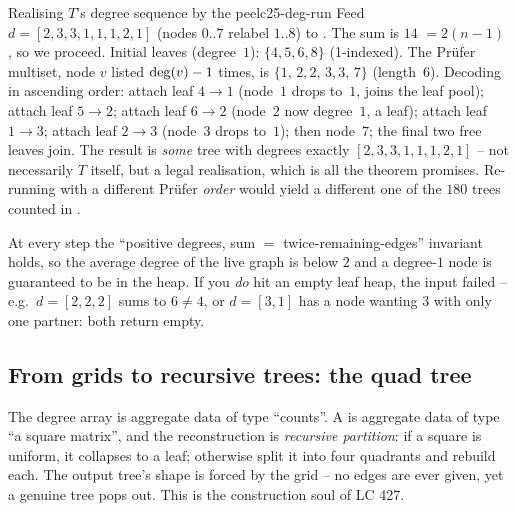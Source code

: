 \begin{example}{Realising $T$'s degree sequence by the peel}{c25-deg-run}
Feed $d=[2,3,3,1,1,1,2,1]$ (nodes $0..7$ relabel $1..8$) to . The sum is $14$
$=2(n-1)$ \checkmark, so we proceed. Initial leaves (degree~$1$): $\{4,5,6,8\}$ (1-indexed). The
Pr\"ufer multiset, node $v$ listed $\operatorname{deg}(v)-1$ times, is $\{1,\,2,2,\,3,3,\,7\}$ (length~$6$).
Decoding in ascending order: attach leaf $4\!\to\!1$ (node~$1$ drops to~$1$, joins the leaf pool);
attach leaf $5\!\to\!2$; attach leaf $6\!\to\!2$ (node~$2$ now degree~$1$, a leaf); attach leaf
$1\!\to\!3$; attach leaf $2\!\to\!3$ (node~$3$ drops to~$1$); then node~$7$; the final two free
leaves join. The result is \emph{some} tree with degrees exactly $[2,3,3,1,1,1,2,1]$ -- not
necessarily $T$ itself, but a legal realisation, which is all the theorem promises. Re-running with a
different Pr\"ufer \emph{order} would yield a different one of the $180$ trees counted in
.
\end{example}
\begin{tracebox}
At every step the ``positive degrees, sum $=$ twice-remaining-edges'' invariant holds, so the
average degree of the live graph is below $2$ and a degree-$1$ node is guaranteed to be in the heap.
If you \emph{do} hit an empty leaf heap, the input failed  -- e.g.\ $d=[2,2,2]$
sums to $6\ne4$, or $d=[3,1]$ has a node wanting $3$ with only one partner: both return empty.
\end{tracebox}

\subsection{From grids to recursive trees: the quad tree}

The degree array is aggregate data of type ``counts''. A  is aggregate data of type
``a square matrix'', and the reconstruction is \emph{recursive partition}: if a square is uniform,
it collapses to a leaf; otherwise split it into four quadrants and rebuild each. The output tree's
shape is forced by the grid -- no edges are ever given, yet a genuine tree pops out. This is the
construction soul of LC 427.

